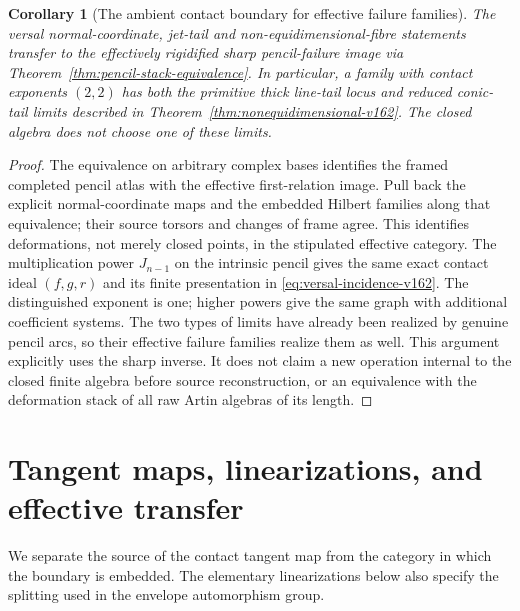 \documentclass[11pt,reqno]{amsart}
\numberwithin{equation}{section}
\newtheorem{corollary}[theorem]{Corollary}
\theoremstyle{definition}\newtheorem{definition}[theorem]{Definition}
\theoremstyle{remark}\newtheorem{remark}[theorem]{Remark}
\begin{document}
\begin{corollary}[The ambient contact boundary for effective failure families]
\label{cor:effective-contact-v162}
The versal normal-coordinate, jet-tail and non-equidimensional-fibre
statements transfer to the effectively rigidified sharp pencil-failure
image via Theorem~\ref{thm:pencil-stack-equivalence}. In particular,
a family with contact exponents $(2,2)$ has both the primitive thick
line-tail locus and reduced conic-tail limits described in
Theorem~\ref{thm:nonequidimensional-v162}. The closed algebra does
not choose one of these limits.
\end{corollary}
\begin{proof}
The equivalence on arbitrary complex bases identifies the framed
completed pencil atlas with the effective first-relation image.
Pull back the explicit normal-coordinate maps and the embedded
Hilbert families along that equivalence; their source torsors and
changes of frame agree. This identifies deformations, not merely
closed points, in the stipulated effective category. The multiplication
power $J_{n-1}$ on the intrinsic pencil gives the same exact contact
ideal $(f,g,r)$ and its finite presentation in
\eqref{eq:versal-incidence-v162}. The distinguished exponent is one;
higher powers give the same graph with additional coefficient systems.
The two types of limits have already been realized by genuine pencil
arcs, so their effective failure families realize them as well.
This argument explicitly uses the sharp inverse. It does not claim
a new operation internal to the closed finite algebra before source
reconstruction, or an equivalence with the deformation stack of all
raw Artin algebras of its length.
\end{proof}


\section{Tangent maps, linearizations, and effective transfer}
\label{sec:tangent-effective-v163}
We separate the source of the contact tangent map from the category in
which the boundary is embedded. The elementary linearizations below
also specify the splitting used in the envelope automorphism group.
\end{document}
